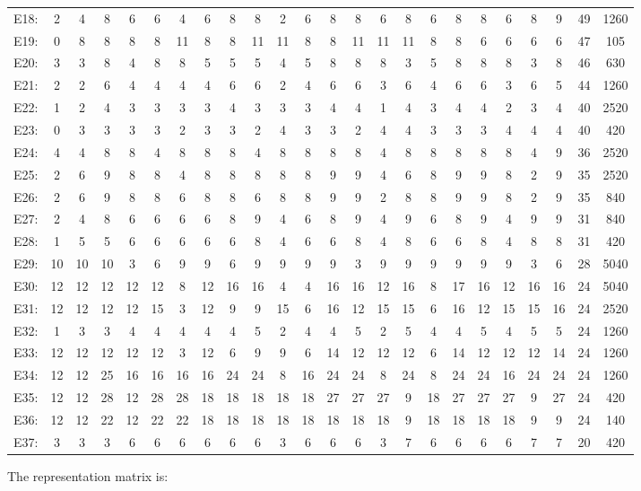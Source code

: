 \documentclass[12pt]{article}
\begin{document}
\begin{center}
\begin{tabular}{cccccccccccccccccccccc|c|c}
E18:&2&4&8&6&6&4&6&8&8&2&6&8&8&6&8&6&8&8&6&8&9&49&1260\\
E19:&0&8&8&8&8&11&8&8&11&11&8&8&11&11&11&8&8&6&6&6&6&47&105\\
E20:&3&3&8&4&8&8&5&5&5&4&5&8&8&8&3&5&8&8&8&3&8&46&630\\
E21:&2&2&6&4&4&4&4&6&6&2&4&6&6&3&6&4&6&6&3&6&5&44&1260\\
E22:&1&2&4&3&3&3&3&4&3&3&3&4&4&1&4&3&4&4&2&3&4&40&2520\\
E23:&0&3&3&3&3&2&3&3&2&4&3&3&2&4&4&3&3&3&4&4&4&40&420\\
E24:&4&4&8&8&4&8&8&8&4&8&8&8&8&4&8&8&8&8&8&4&9&36&2520\\
E25:&2&6&9&8&8&4&8&8&8&8&8&9&9&4&6&8&9&9&8&2&9&35&2520\\
E26:&2&6&9&8&8&6&8&8&6&8&8&9&9&2&8&8&9&9&8&2&9&35&840\\
E27:&2&4&8&6&6&6&6&8&9&4&6&8&9&4&9&6&8&9&4&9&9&31&840\\
E28:&1&5&5&6&6&6&6&6&8&4&6&6&8&4&8&6&6&8&4&8&8&31&420\\
E29:&10&10&10&3&6&9&9&6&9&9&9&9&3&9&9&9&9&9&9&3&6&28&5040\\
E30:&12&12&12&12&12&8&12&16&16&4&4&16&16&12&16&8&17&16&12&16&16&24&5040\\
E31:&12&12&12&12&15&3&12&9&9&15&6&16&12&15&15&6&16&12&15&15&16&24&2520\\
E32:&1&3&3&4&4&4&4&4&5&2&4&4&5&2&5&4&4&5&4&5&5&24&1260\\
E33:&12&12&12&12&12&3&12&6&9&9&6&14&12&12&12&6&14&12&12&12&14&24&1260\\
E34:&12&12&25&16&16&16&16&24&24&8&16&24&24&8&24&8&24&24&16&24&24&24&1260\\
E35:&12&12&28&12&28&28&18&18&18&18&18&27&27&27&9&18&27&27&27&9&27&24&420\\
E36:&12&12&22&12&22&22&18&18&18&18&18&18&18&18&9&18&18&18&18&9&9&24&140\\
E37:&3&3&3&6&6&6&6&6&6&3&6&6&6&3&7&6&6&6&6&7&7&20&420\\
\end{tabular}
\end{center}
The representation matrix is:
\end{document}
